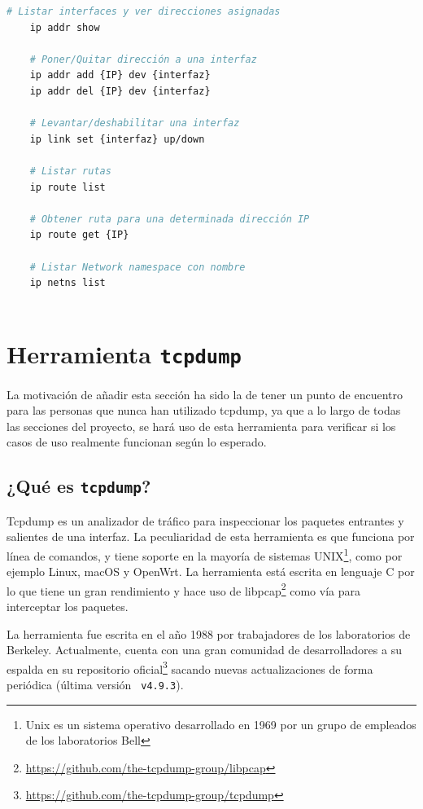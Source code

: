 \begin{lstlisting}[language= bash, style=Consola, caption={Comandos útiles con iproute2},label=code:iproute2_use]
    # Listar interfaces y ver direcciones asignadas
    ip addr show
    
    # Poner/Quitar dirección a una interfaz
    ip addr add {IP} dev {interfaz}
    ip addr del {IP} dev {interfaz}
    
    # Levantar/deshabilitar una interfaz 
    ip link set {interfaz} up/down
    
    # Listar rutas
    ip route list 
    
    # Obtener ruta para una determinada dirección IP
    ip route get {IP}
    
    # Listar Network namespace con nombre
    ip netns list
    

\end{lstlisting}
\newpage

\section{Herramienta \texttt{tcpdump}}
\label{tcpdump}
La motivación de añadir esta sección ha sido la de tener un punto de encuentro para las personas que nunca han utilizado tcpdump, ya que a lo largo de todas las secciones del proyecto, se hará uso de esta herramienta para verificar si los casos de uso realmente funcionan según lo esperado.

\subsection{¿Qué es \texttt{tcpdump}?}

Tcpdump es un analizador de tráfico para inspeccionar los paquetes entrantes y salientes de una interfaz. La peculiaridad de esta herramienta es que funciona por línea de comandos, y tiene soporte en la mayoría de sistemas UNIX\footnote{Unix es un sistema operativo desarrollado en 1969 por un grupo de empleados de los laboratorios Bell}, como por ejemplo Linux, macOS y OpenWrt. La herramienta está escrita en lenguaje C por lo que tiene un gran rendimiento y hace uso de libpcap\footnote{\url{https://github.com/the-tcpdump-group/libpcap}} como vía para interceptar los paquetes.\\
\par
La herramienta fue escrita en el año 1988 por trabajadores de los laboratorios de Berkeley. Actualmente, cuenta con una gran comunidad de desarrolladores a su espalda en su repositorio oficial\footnote{\url{https://github.com/the-tcpdump-group/tcpdump}} sacando nuevas actualizaciones de forma periódica (última versión \texttt{
    v4.9.3}).

